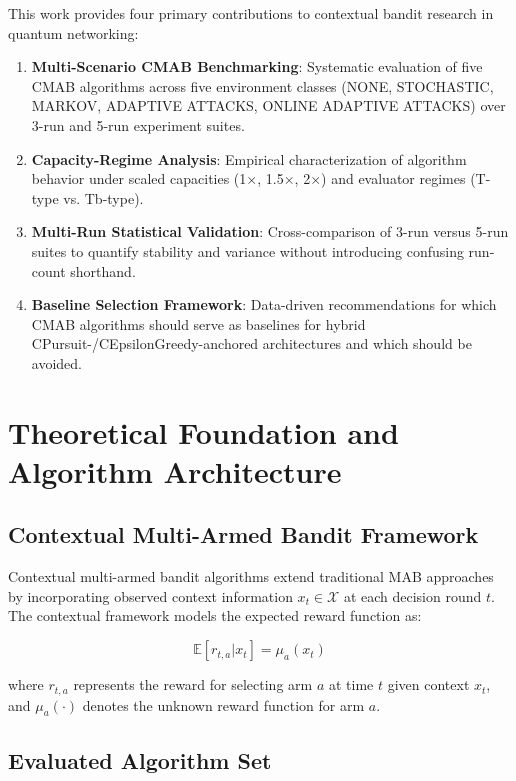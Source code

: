 \documentclass[12pt,a4paper]{article}
\begin{document}
This work provides four primary contributions to contextual bandit research in quantum networking:

\begin{enumerate}
\item \textbf{Multi-Scenario CMAB Benchmarking}: Systematic evaluation of five CMAB algorithms across five environment classes (NONE, STOCHASTIC, MARKOV, ADAPTIVE ATTACKS, ONLINE ADAPTIVE ATTACKS) over 3-run and 5-run experiment suites.
\item \textbf{Capacity-Regime Analysis}: Empirical characterization of algorithm behavior under scaled capacities (1$\times$, 1.5$\times$, 2$\times$) and evaluator regimes (T-type vs. Tb-type).
\item \textbf{Multi-Run Statistical Validation}: Cross-comparison of 3-run versus 5-run suites to quantify stability and variance without introducing confusing run-count shorthand.
\item \textbf{Baseline Selection Framework}: Data-driven recommendations for which CMAB algorithms should serve as baselines for hybrid CPursuit-/CEpsilonGreedy-anchored architectures and which should be avoided.
\end{enumerate}

\newpage
\section{Theoretical Foundation and Algorithm Architecture}

\subsection{Contextual Multi-Armed Bandit Framework}

Contextual multi-armed bandit algorithms extend traditional MAB approaches by incorporating observed context information $x_t \in \mathcal{X}$ at each decision round $t$. The contextual framework models the expected reward function as:

\begin{equation}
\mathbb{E}[r_{t,a} | x_t] = \mu_a(x_t)
\end{equation}

where $r_{t,a}$ represents the reward for selecting arm $a$ at time $t$ given context $x_t$, and $\mu_a(\cdot)$ denotes the unknown reward function for arm $a$.

\subsection{Evaluated Algorithm Set}
\end{document}
